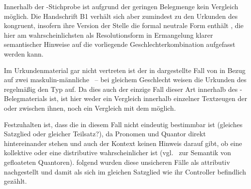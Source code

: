 Innerhalb der \KC{}-Stichprobe ist aufgrund der geringen Belegmenge kein
Vergleich möglich. Die Handschrift B1 verhält sich aber zumindest zu den
Urkunden des \CAO{} kongruent, insofern ihre Version der Stelle die
formal neutrale Form  enthält
, die hier am wahrscheinlichsten als Resolutionsform in
Ermangelung klarer semantischer Hinweise auf die vorliegende
Geschlechterkombination aufgefasst werden kann.

Im Urkundenmaterial gar nicht vertreten ist der in 
dargestellte Fall von  in Bezug auf zwei maskulin-männliche
~-- bei gleichem Geschlecht weisen die Urkunden des
\CAO{} regelmäßig den Typ  auf. Da dies auch der einzige Fall
dieser Art innerhalb des \KC{}-Belegmaterials ist, ist hier weder ein Vergleich
innerhalb einzelner Textzeugen der \KC{} oder zwischen ihnen, noch ein
Vergleich mit dem \CAO{} möglich.

\begin{exe}
\end{exe}

Festzuhalten ist, dass die  in diesem Fall nicht
eindeutig bestimmbar ist (gleiches Satzglied oder gleicher
Teilsatz?), da Pronomen und Quantor direkt hintereinander stehen und auch der
Kontext keinen Hinweis darauf gibt, ob eine kollektive oder eine distributive
 wahrscheinlicher ist (vgl.~ zur Semantik
von gefloateten Quantoren). \citet[623]{ksw2} folgend
wurden diese unsicheren Fälle als attributiv nachgestellt und
damit als sich im gleichen Satzglied wie ihr Controller befindlich gezählt.

